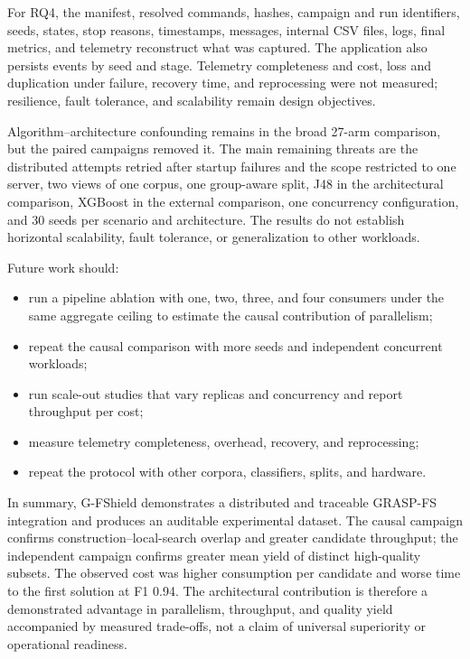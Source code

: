 

For RQ4, the manifest, resolved commands, hashes, campaign and run identifiers, seeds, states, stop reasons, timestamps, messages, internal CSV files, logs, final metrics, and telemetry reconstruct what was captured. The application also persists events by seed and stage. Telemetry completeness and cost, loss and duplication under failure, recovery time, and reprocessing were not measured; resilience, fault tolerance, and scalability remain design objectives.

Algorithm--architecture confounding remains in the broad 27-arm comparison, but the paired campaigns removed it. The main remaining threats are the distributed attempts retried after startup failures and the scope restricted to one server, two views of one corpus, one group-aware split, J48 in the architectural comparison, XGBoost in the external comparison, one concurrency configuration, and 30 seeds per scenario and architecture. The results do not establish horizontal scalability, fault tolerance, or generalization to other workloads.

Future work should:

\begin{itemize}
  \item run a pipeline ablation with one, two, three, and four consumers under the same aggregate ceiling to estimate the causal contribution of parallelism;
  \item repeat the causal comparison with more seeds and independent concurrent workloads;
  \item run scale-out studies that vary replicas and concurrency and report throughput per cost;
  \item measure telemetry completeness, overhead, recovery, and reprocessing;
  \item repeat the protocol with other corpora, classifiers, splits, and hardware.
\end{itemize}

In summary, G-FShield demonstrates a distributed and traceable GRASP-FS integration and produces an auditable experimental dataset. The causal campaign confirms construction--local-search overlap and greater candidate throughput; the independent campaign confirms greater mean yield of distinct high-quality subsets. The observed cost was higher consumption per candidate and worse time to the first solution at F1 0.94. The architectural contribution is therefore a demonstrated advantage in parallelism, throughput, and quality yield accompanied by measured trade-offs, not a claim of universal superiority or operational readiness.
